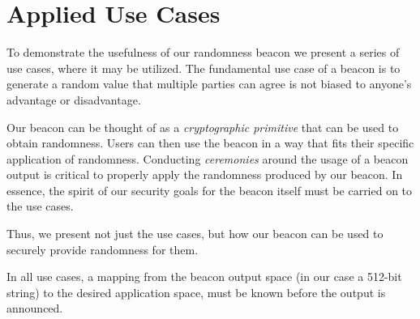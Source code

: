 \section{Applied Use Cases}\label{sec:applied_use_cases}
To demonstrate the usefulness of our randomness beacon we present a series of use cases, where it may be utilized.
The fundamental use case of a beacon is to generate a random value that multiple parties can agree is not biased to anyone's advantage or disadvantage.

Our beacon can be thought of as a \emph{cryptographic primitive} that can be used to obtain randomness.
Users can then use the beacon in a way that fits their specific application of randomness.
Conducting \emph{ceremonies} around the usage of a beacon output is critical to properly apply the randomness produced by our beacon.
In essence, the spirit of our security goals for the beacon itself must be carried on to the use cases.

Thus, we present not just the use cases, but how our beacon can be used to securely provide randomness for them.

In all use cases, a mapping from the beacon output space (in our case a 512-bit string) to the desired application space, must be known before the output is announced.
